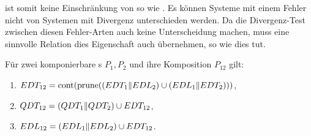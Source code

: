 \DRel{} ist somit keine Einschränkung von \ERel{} so wie \QRel{}. Es können
Systeme mit einem Fehler nicht von Systemen mit Divergenz
unterschieden werden. Da die Divergenz-Test zwischen diesen Fehler-Arten auch
keine Unterscheidung machen, muss eine sinnvolle Relation dies Eigenschaft auch
übernehmen, so wie \DRel{} dies tut.

\begin{Satz}
  \label{DivSemSatz}
  Für zwei komponierbare \MEIO{}s $P_1,P_2$ und ihre Komposition $P_{12}$ gilt:
  \begin{enumerate}
    \item $EDT _{12} =\mathrm{cont} (\mathrm{prune} ((EDT _1\|EDL _2)\cup (EDL _1\|EDT
      _2)))$,
    \item $QDT _{12} =(QDT _1\|QDT _2)\cup EDT _{12}$,
    \item $EDL _{12} =(EDL _1\|EDL _2)\cup EDT _{12}$.
  \end{enumerate}
\end{Satz}
